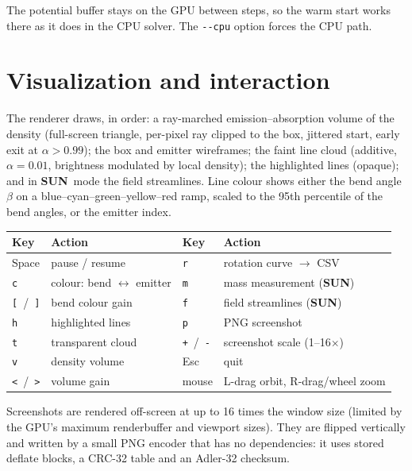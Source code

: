 \documentclass[12pt]{article}
\newcommand{\SUN}{\textcolor{sunc}{\textbf{\textsf{SUN}}}}
\newcommand{\opt}[1]{\texttt{-{}-#1}}
\begin{document}
The potential buffer stays on the GPU between steps, so the warm start
works there as it does in the CPU solver. The \opt{cpu} option forces the CPU path.

\section{Visualization and interaction}

The renderer draws, in order: a ray-marched emission--absorption volume of the
density (full-screen triangle, per-pixel ray clipped to the box, jittered start,
early exit at $\alpha>0.99$); the box and emitter wireframes; the faint line
cloud (additive, $\alpha=0.01$, brightness modulated by local density); the
highlighted lines (opaque); and in \SUN\ mode the field streamlines. Line colour
shows either the bend angle $\beta$ on a blue--cyan--green--yellow--red ramp,
scaled to the 95th percentile of the bend angles, or the emitter index.

\begin{center}
\small
\begin{tabular}{@{}ll@{\qquad}ll@{}}
\toprule
Key & Action & Key & Action\\
\midrule
Space & pause / resume & \texttt{r} & rotation curve $\to$ CSV \\
\texttt{c} & colour: bend $\leftrightarrow$ emitter & \texttt{m} & mass measurement (\SUN) \\
\texttt{[}\ /\ \texttt{]} & bend colour gain & \texttt{f} & field streamlines (\SUN) \\
\texttt{h} & highlighted lines & \texttt{p} & PNG screenshot \\
\texttt{t} & transparent cloud & \texttt{+}\ /\ \texttt{-} & screenshot scale (1--16$\times$) \\
\texttt{v} & density volume & Esc & quit \\
\texttt{<}\ /\ \texttt{>} & volume gain & mouse & L-drag orbit, R-drag/wheel zoom \\
\bottomrule
\end{tabular}
\end{center}

Screenshots are rendered off-screen at up to 16 times the window size (limited
by the GPU's maximum renderbuffer and viewport sizes). They are flipped vertically and
written by a small PNG encoder that has no dependencies: it uses stored deflate blocks, a CRC-32
table and an Adler-32 checksum.
\end{document}
